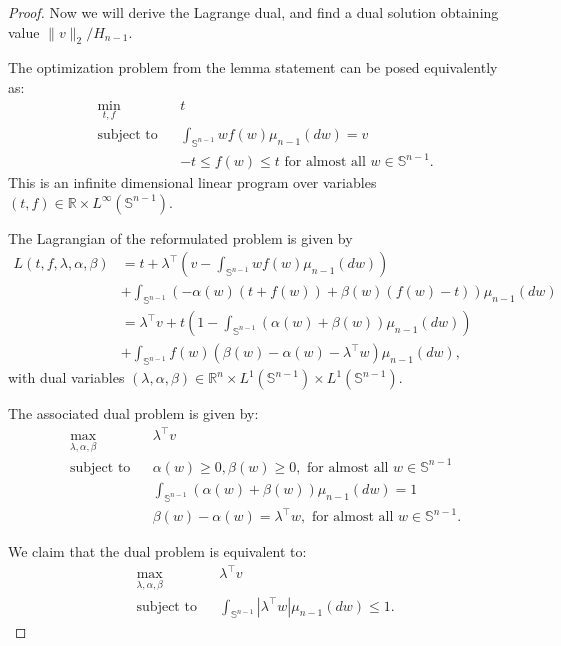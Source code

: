 \documentclass[twoside]{article}
\theoremstyle{definition}
\newcommand{\R}{\mathbb{R}}
\renewcommand{\S}{\mathbb{S}}
\newcommand{\1}[1]{\scalebox{1.25}{$\mathds{1}$}\left[#1\right]}
\begin{document}
\begin{proof}
Now we will derive the Lagrange dual, and find a dual solution obtaining value $\|v\|_2/H_{n-1}$.

The optimization problem from the lemma statement can be posed equivalently as:
\begin{align*}
&\min_{t,f} && t\\
&\textrm{subject to} && \int_{\S^{n-1}}w f(w)\mu_{n-1}(dw)=v \\
&&& -t\le f(w)\le t \textrm{ for almost all } w\in\S^{n-1}.
\end{align*}
This is an infinite dimensional linear program over variables $(t,f)\in \R\times L^{\infty}(\S^{n-1})$.

The Lagrangian of the reformulated problem is given by
\begin{align*}
L(t,f,\lambda,\alpha,\beta)%
&=t+\lambda^\top \left(v- \int_{\S^{n-1}}w f(w)\mu_{n-1}(dw)\right)
\\ &+\int_{\S^{n-1}}\left(-\alpha(w)(t+f(w))+\beta(w)(f(w)-t) \right)\mu_{n-1}(dw) \\
&=\lambda^\top v+
t\left(1-\int_{\S^{n-1}}(\alpha(w)+\beta(w))\mu_{n-1}(dw) \right)\\
&+\int_{\S^{n-1}}f(w)\left(\beta(w)-\alpha(w)-\lambda^\top w \right)\mu_{n-1}(dw),
\end{align*}
with dual variables $(\lambda,\alpha,\beta)\in \R^n\times L^1(\S^{n-1})\times L^1(\S^{n-1}).$

The associated dual problem is given by:
\begin{align*}
&\max_{\lambda,\alpha,\beta} && \lambda^\top v \\
&\textrm{subject to} && \alpha(w)\ge 0, \beta(w)\ge 0, \textrm{ for almost all } w\in \S^{n-1} \\
&&& \int_{\S^{n-1}}(\alpha(w)+\beta(w))\mu_{n-1}(dw)=1\\
&&& \beta(w)-\alpha(w)=\lambda^\top w, \textrm{ for almost all } w\in \S^{n-1}.
\end{align*}

We claim that the dual problem is equivalent to:
\begin{subequations}
\label{eq:vDual}
\begin{align}
&\max_{\lambda,\alpha,\beta} && \lambda^\top v \\
&\textrm{subject to} && \int_{\S^{n-1}}|\lambda^\top w|\mu_{n-1}(dw)\le 1.
\end{align}
\end{subequations}


\end{proof}
\end{document}
